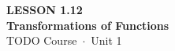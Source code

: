 \documentclass[aspectratio=169, 11pt]{beamer}
\begin{document}
{
\begin{frame}[plain]
  \vspace{2.8cm}\hspace{0.55cm}%
  \begin{minipage}{0.9\textwidth}
    {\color{goldacc}\bfseries\small LESSON 1.12}\\[0.5cm]
    {\color{white}\bfseries\LARGE Transformations of Functions}\\[1.2cm]
    {\color{skymid}\small TODO Course~$\cdot$~Unit 1}
  \end{minipage}
\end{frame}
}

\begin{frame}[t, plain]
\end{frame}
\end{document}
